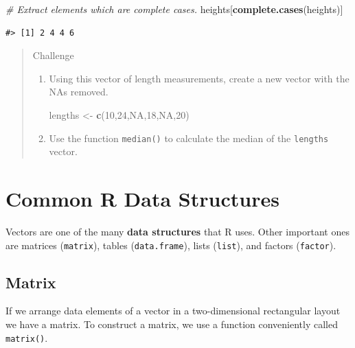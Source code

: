 \documentclass[]{book}
\newenvironment{Shaded}{\begin{snugshade}}{\end{snugshade}}
\newcommand{\KeywordTok}[1]{\textcolor[rgb]{0.13,0.29,0.53}{\textbf{#1}}}
\newcommand{\DecValTok}[1]{\textcolor[rgb]{0.00,0.00,0.81}{#1}}
\newcommand{\StringTok}[1]{\textcolor[rgb]{0.31,0.60,0.02}{#1}}
\newcommand{\CommentTok}[1]{\textcolor[rgb]{0.56,0.35,0.01}{\textit{#1}}}
\newcommand{\OtherTok}[1]{\textcolor[rgb]{0.56,0.35,0.01}{#1}}
\newcommand{\NormalTok}[1]{#1}
\begin{document}
\begin{Shaded}
\begin{Highlighting}[]
\CommentTok{# Extract elements which are complete cases.}
\NormalTok{heights[}\KeywordTok{complete.cases}\NormalTok{(heights)]}
\end{Highlighting}
\end{Shaded}

\begin{verbatim}
#> [1] 2 4 4 6
\end{verbatim}

\begin{quote}
Challenge

\begin{enumerate}
\def\labelenumi{\arabic{enumi}.}
\item
  Using this vector of length measurements, create a new vector with the
  NAs removed.

\begin{Shaded}
\begin{Highlighting}[]
\NormalTok{lengths <-}\StringTok{ }\KeywordTok{c}\NormalTok{(}\DecValTok{10}\NormalTok{,}\DecValTok{24}\NormalTok{,}\OtherTok{NA}\NormalTok{,}\DecValTok{18}\NormalTok{,}\OtherTok{NA}\NormalTok{,}\DecValTok{20}\NormalTok{)}
\end{Highlighting}
\end{Shaded}
\item
  Use the function \texttt{median()} to calculate the median of the
  \texttt{lengths} vector.
\end{enumerate}
\end{quote}

\section{Common R Data Structures}\label{common-r-data-structures}

Vectors are one of the many \textbf{data structures} that R uses. Other
important ones are matrices (\texttt{matrix}), tables
(\texttt{data.frame}), lists (\texttt{list}), and factors
(\texttt{factor}).

\subsection{Matrix}\label{matrix}

If we arrange data elements of a vector in a two-dimensional rectangular
layout we have a matrix. To construct a matrix, we use a function
conveniently called \texttt{matrix()}.
\end{document}
